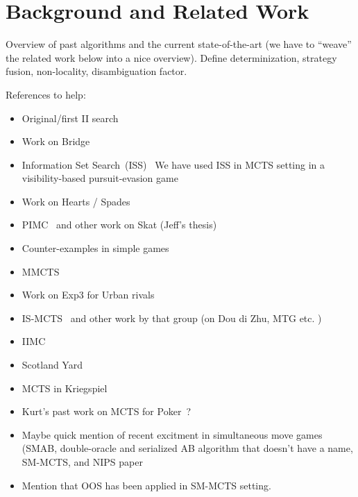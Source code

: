 \documentclass[letterpaper]{article}
\begin{document}
\section{Background and Related Work}

Overview of past algorithms and the current state-of-the-art (we have to ``weave'' the related work below into a nice overview).
Define determinization, strategy fusion, non-locality, disambiguation factor. 

References to help:
\begin{itemize}
\item Original/first II search~\cite{Frank98Finding}
\item Work on Bridge~\cite{Ginsberg01}
\item Information Set Search~(ISS)~\cite{Parker10iss,Parker06paranoia}
We have used ISS in MCTS setting in a visibility-based pursuit-evasion game~\cite{Lisy12peg}
\item Work on Hearts / Spades~\cite{Sturtevant08An}
\item PIMC~\cite{long2010understanding} and other work on Skat (Jeff's thesis)
\item Counter-examples in simple games~\cite{Shafiei09,Ponsen11Computing} 
\item MMCTS~\cite{Auger11Multiple}
\item Work on Exp3 for Urban rivals~\cite{Teytaud11Upper,StPierre12Online}
\item IS-MCTS~\cite{Cowling12ISMCTS} and other work by that group (on Dou di Zhu, MTG etc. \cite{Whitehouse11DDZ,Cowling12MTG})
\item IIMC~\cite{Furtak13Recursive}
\item Scotland Yard~\cite{Nijssen12SY}
\item MCTS in Kriegspiel~\cite{Ciancarini10Kriegspiel}
\item Kurt's past work on MCTS for Poker~\cite{vdbroek09MCTSPoker}?
\item Maybe quick mention of recent excitment in simultaneous move games (SMAB, double-oracle and serialized AB algorithm that doesn't have a name, SM-MCTS, and NIPS paper
\item Mention that OOS has been applied in SM-MCTS setting.
\end{itemize}
\end{document}
